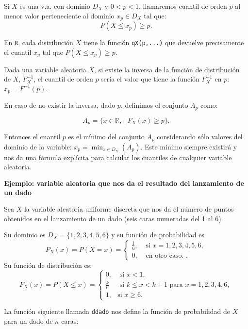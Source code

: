 \documentclass[]{book}
\newenvironment{Shaded}{\begin{snugshade}}{\end{snugshade}}
\newcommand{\ControlFlowTok}[1]{\textcolor[rgb]{0.13,0.29,0.53}{\textbf{#1}}}
\newcommand{\DataTypeTok}[1]{\textcolor[rgb]{0.13,0.29,0.53}{#1}}
\newcommand{\DecValTok}[1]{\textcolor[rgb]{0.00,0.00,0.81}{#1}}
\newcommand{\KeywordTok}[1]{\textcolor[rgb]{0.13,0.29,0.53}{\textbf{#1}}}
\newcommand{\NormalTok}[1]{#1}
\newcommand{\OperatorTok}[1]{\textcolor[rgb]{0.81,0.36,0.00}{\textbf{#1}}}
\newcommand{\StringTok}[1]{\textcolor[rgb]{0.31,0.60,0.02}{#1}}
\begin{document}
Si \(X\) es una v.a. con dominio \(D_X\) y \(0<p<1\), llamaremos cuantil de orden \(p\) al menor valor perteneciente al dominio \(x_p\in D_X\) tal que:
\[P(X\leq x_p)\geq p.\]

En \texttt{R}, cada distribución \(X\) tiene la función \texttt{qX(p,...)} que devuelve precisamente el cuantil \(x_p\) tal que \(P(X\leq x_p)\geq p.\)

Dada una variable aleatoria \(X\), si existe la inversa de la función de distribución de \(X\), \(F_X^{-1}\), el cuantil de orden \(p\) sería el valor que tiene la función \(F_X^{-1}\) en \(p\): \(x_p=F^{-1}(p)\).

En caso de no existir la inversa, dado \(p\), definimos el conjunto \(A_p\) como:

\[
A_p =\{x\in\mathbb{R},\ |\ F_X(x)\geq p\}.
\]

Entonces el cuantil \(p\) es el mínimo del conjunto \(A_p\) considerando sólo valores del dominio de la variable: \(x_p =\displaystyle\min_{x\in D_X}(A_p)\). Este mínimo siempre existirá y nos da una fórmula explícita para calcular los cuantiles de cualquier variable aleatoria.

\textbf{Ejemplo: variable aleatoria que nos da el resultado del lanzamiento de un dado}

Sea \(X\) la variable aleatoria uniforme discreta que nos da el número de puntos obtenidos en el lanzamiento de un dado (seis caras numeradas del 1 al 6).

Su dominio es \(D_X=\{1,2,3,4,5,6\}\) y su función de probabilidad es
\[
P_X(x)=P(X=x)=
\left\{
\begin{array}{ll}
 \frac{1}{6}, & \mbox{ si } x=1,2,3,4,5,6, \\
0, & \mbox{ en otro caso. }.
\end{array}
\right.
\]
Su función de distribución es:
\[
F_X(x)= P(X\leq x)=
\left\{
\begin{array}{ll}
0, & \mbox{ si } x<1, \\
\frac{k}{6} & \mbox{ si } k\leq x< k+1 \mbox{ para } x= 1,2,3,4,6, \\
 1, & \mbox{si  } x \geq 6.
\end{array}
\right.
\]

La función siguiente llamada \texttt{ddado} nos define la función de probabilidad de \(X\) para un dado de \(n\) caras:

\begin{Shaded}
\end{Shaded}
\end{document}
